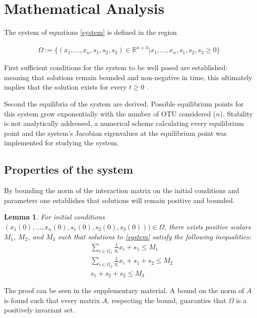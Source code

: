 \documentclass[3p,times]{article}
\newcommand{\R}{\mathbb{R}}
\newtheorem{lemma}{Lemma}
\begin{document}
\section{Mathematical Analysis}

The system of equations \eqref{system} is defined in the region 

\begin{align*}
\Omega := \{ (x_1,\dots,x_n,s_1,s_2,s_3)\in  \R^{n+3} | x_1,\dots,x_n,s_1,s_2,s_3  \geq 0  \}
\end{align*}

First sufficient conditions for the system to be well posed are established: meaning that solutions remain bounded and non-negative in time, this ultimately implies that the solution exists for every $t \geq 0$ \cite{Khalil1996}. 

Second the equilibria of the system are derived. Possible equilibrium points for this system grow exponentially with the number of OTU considered ($n$).  Stability is not analytically addressed, a numerical scheme calculating every equilibrium point and the system's Jacobian eigenvalues at the equilibrium point was implemented for studying the system. 


\subsection{Properties of the system}

By bounding the norm of the interaction matrix on the initial conditions and parameters one establishes that solutions will remain positive and bounded. 

\begin{lemma}
	\label{l1}
	For initial conditions $(x_1(0),\dots,x_n(0),s_1(0),s_2(0),s_3(0)))\in \Omega$, there exists positive scalars $M_1$, $M_2$, and $M_3$ such that solutions to \eqref{system} satisfy the following inequalities:
	\begin{align}
	&\sum \limits_{i \in G_1} \frac{1}{y_i}x_i + s_1 \leq M_1 \\
	&\sum \limits_{i \in G_2} \frac{1}{y_i}x_i + s_1 +s_2 \leq M_2 \\
	&s_1 + s_2 + s_2 \leq M_3
	\end{align}
\end{lemma}

The proof can be seen in the supplementary material. A bound on the norm of $A$ is found such that every matrix $A$, respecting the bound, guaranties that $\Omega$ is a positively invariant set.
\end{document}
